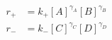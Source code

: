 \begin{eqnarray}\label{eqn:mass-action}
r_+  & =  k_+[A]^{\gamma_A}[B]^{\gamma_B} \\
r_-  & =  k_-[C]^{\gamma_C}[D]^{\gamma_D} \\
\end{eqnarray}